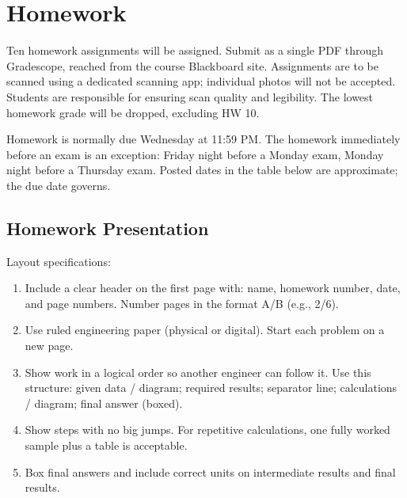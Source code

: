 \section*{Homework}
Ten homework assignments will be assigned. Submit as a single PDF through Gradescope, reached from the course Blackboard site. Assignments are to be scanned using a dedicated scanning app; individual photos will not be accepted. Students are responsible for ensuring scan quality and legibility. The lowest homework grade will be dropped, excluding HW 10.

Homework is normally due Wednesday at 11:59 PM. The homework immediately before an exam is an exception: Friday night before a Monday exam, Monday night before a Thursday exam. Posted dates in the table below are approximate; the due date governs.

{\small}

\newpage
\subsection*{Homework Presentation}
Layout specifications:
\begin{enumerate}
\item Include a clear header on the first page with: name, homework number, date, and page numbers. Number pages in the format A/B (e.g., 2/6).
\item Use ruled engineering paper (physical or digital). Start each problem on a new page.
\item Show work in a logical order so another engineer can follow it. Use this structure: given data / diagram; required results; separator line; calculations / diagram; final answer (boxed).
\item Show steps with no big jumps. For repetitive calculations, one fully worked sample plus a table is acceptable.
\item Box final answers and include correct units on intermediate results and final results.
\end{enumerate}
